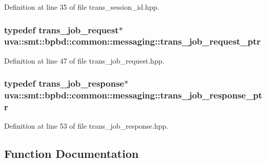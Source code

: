 Definition at line 35 of file trans\+\_\+session\+\_\+id.\+hpp.

\hypertarget{namespaceuva_1_1smt_1_1bpbd_1_1common_1_1messaging_af373ab262c0cab837c6ebe5e2eb62ea2}{}
\subsubsection[{trans\+\_\+job\+\_\+request\+\_\+ptr}]{\setlength{\rightskip}{0pt plus 5cm}typedef {\bf trans\+\_\+job\+\_\+request}$\ast$ {\bf uva\+::smt\+::bpbd\+::common\+::messaging\+::trans\+\_\+job\+\_\+request\+\_\+ptr}}\label{namespaceuva_1_1smt_1_1bpbd_1_1common_1_1messaging_af373ab262c0cab837c6ebe5e2eb62ea2}


Definition at line 47 of file trans\+\_\+job\+\_\+request.\+hpp.

\hypertarget{namespaceuva_1_1smt_1_1bpbd_1_1common_1_1messaging_a13f39e68e38d11dbd940edb12359e1a3}{}
\subsubsection[{trans\+\_\+job\+\_\+response\+\_\+ptr}]{\setlength{\rightskip}{0pt plus 5cm}typedef {\bf trans\+\_\+job\+\_\+response}$\ast$ {\bf uva\+::smt\+::bpbd\+::common\+::messaging\+::trans\+\_\+job\+\_\+response\+\_\+ptr}}\label{namespaceuva_1_1smt_1_1bpbd_1_1common_1_1messaging_a13f39e68e38d11dbd940edb12359e1a3}


Definition at line 53 of file trans\+\_\+job\+\_\+response.\+hpp.



\subsection{Function Documentation}
\hypertarget{namespaceuva_1_1smt_1_1bpbd_1_1common_1_1messaging_a5f985d67f9d927f75f9788ecb56f8f0f}{}
